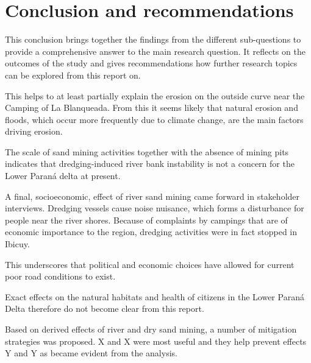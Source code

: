 \chapter{Conclusion and recommendations}
\label{chapter:conclusion}

This conclusion brings together the findings from the different sub-questions to provide a comprehensive answer to the main research question. It reflects on the outcomes of the study and gives recommendations how further research topics can be explored from this report on.








This helps to at least partially explain the erosion on the outside curve near the Camping of La Blanqueada. From this it seems likely that natural erosion and floods, which occur more frequently due to climate change, are the main factors driving erosion.

The scale of sand mining activities together with the absence of mining pits indicates that dredging-induced river bank instability is not a concern for the Lower Paraná delta at present.

 A final, socioeconomic, effect of river sand mining came forward in stakeholder interviews. Dredging vessels cause noise nuisance, which forms a disturbance for people near the river shores. Because of complaints by campings that are of economic importance to the region, dredging activities were in fact stopped in Ibicuy.


This underscores that political and economic choices have allowed for current poor road conditions to exist.

Exact effects on the natural habitats and health of citizens in the Lower Paraná Delta therefore do not become clear from this report.

Based on derived effects of river and dry sand mining, a number of mitigation strategies was proposed. X and X were most useful and they help prevent effects Y and Y as became evident from the analysis.